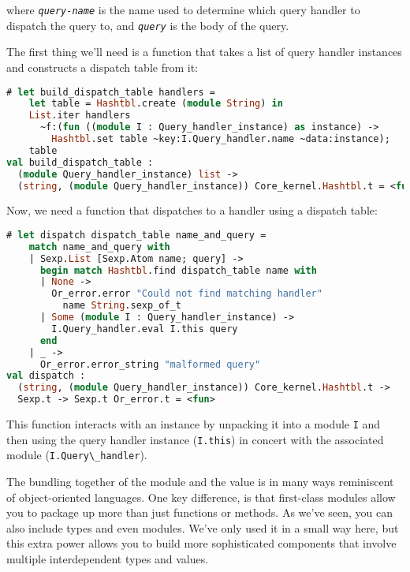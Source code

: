 where \emph{\passthrough{\lstinline!query-name!}} is the name used to
determine which query handler to dispatch the query to, and
\emph{\passthrough{\lstinline!query!}} is the body of the query.

The first thing we'll need is a function that takes a list of query
handler instances and constructs a dispatch table from it:

\begin{lstlisting}[language=Caml]
# let build_dispatch_table handlers =
    let table = Hashtbl.create (module String) in
    List.iter handlers
      ~f:(fun ((module I : Query_handler_instance) as instance) ->
        Hashtbl.set table ~key:I.Query_handler.name ~data:instance);
    table
val build_dispatch_table :
  (module Query_handler_instance) list ->
  (string, (module Query_handler_instance)) Core_kernel.Hashtbl.t = <fun>
\end{lstlisting}

Now, we need a function that dispatches to a handler using a dispatch
table:

\begin{lstlisting}[language=Caml]
# let dispatch dispatch_table name_and_query =
    match name_and_query with
    | Sexp.List [Sexp.Atom name; query] ->
      begin match Hashtbl.find dispatch_table name with
      | None ->
        Or_error.error "Could not find matching handler"
          name String.sexp_of_t
      | Some (module I : Query_handler_instance) ->
        I.Query_handler.eval I.this query
      end
    | _ ->
      Or_error.error_string "malformed query"
val dispatch :
  (string, (module Query_handler_instance)) Core_kernel.Hashtbl.t ->
  Sexp.t -> Sexp.t Or_error.t = <fun>
\end{lstlisting}

This function interacts with an instance by unpacking it into a module
\passthrough{\lstinline!I!} and then using the query handler instance
(\passthrough{\lstinline!I.this!}) in concert with the associated module
(\passthrough{\lstinline!I.Query\_handler!}).

The bundling together of the module and the value is in many ways
reminiscent of object-oriented languages. One key difference, is that
first-class modules allow you to package up more than just functions or
methods. As we've seen, you can also include types and even modules.
We've only used it in a small way here, but this extra power allows you
to build more sophisticated components that involve multiple
interdependent types and values.

